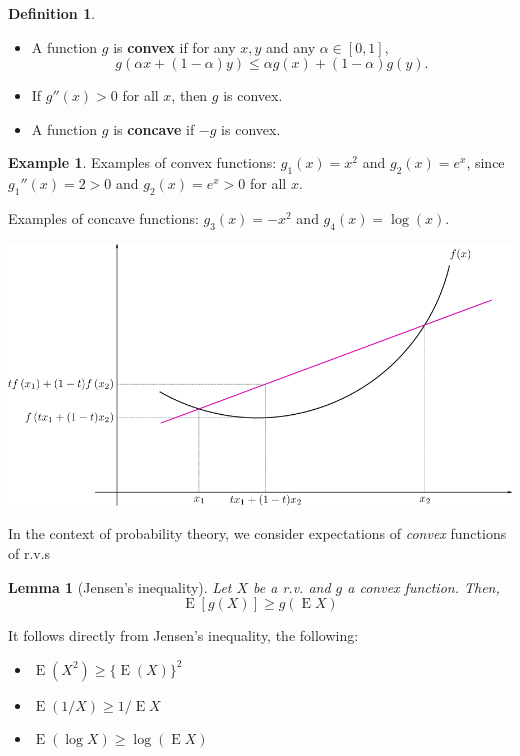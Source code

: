 \documentclass[
]{book}
\providecommand{\tightlist}{%
  \setlength{\itemsep}{0pt}\setlength{\parskip}{0pt}}
\DeclareMathOperator{\E}{E}
\newtheorem{lemma}{Lemma}[chapter]
\theoremstyle{definition}
\newtheorem{definition}{Definition}[chapter]
\theoremstyle{definition}
\newtheorem{example}{Example}[chapter]
\theoremstyle{definition}
\theoremstyle{definition}
\theoremstyle{remark}
\begin{document}
\begin{definition}

\begin{itemize}
\item
  A function \(g\) is \textbf{convex} if for any \(x,y\) and any
  \(\alpha \in [0,1]\),
  \[g(\alpha x + (1-\alpha)y) \leq \alpha g(x) + (1-\alpha)g(y).\]
\item
  If \(g''(x)>0\) for all \(x\), then \(g\) is convex.
\item
  A function \(g\) is \textbf{concave} if \(-g\) is convex.
\end{itemize}

\end{definition}

\begin{example}
Examples of convex functions: \(g_1(x) = x^2\) and \(g_2(x) = e^x\), since
\(g_1''(x) = 2>0\) and \(g_2(x)=e^x > 0\) for all \(x\).

Examples of concave functions: \(g_3(x) = -x^2\) and \(g_4(x) = \log(x)\).
\end{example}

\begin{center}\includegraphics[width=0.8\linewidth]{figure/01-jensen} \end{center}

In the context of probability theory, we consider expectations of \emph{convex} functions of r.v.s

\begin{lemma}[Jensen's inequality]
Let \(X\) be a r.v. and \(g\) a convex function. Then, \[\E\left[g(X) \right] \geq g\left(\E X \right)\]
\end{lemma}

It follows directly from Jensen's inequality, the following:

\begin{itemize}
\tightlist
\item
  \(\E(X^2) \geq \{\E(X)\}^2\)
\item
  \(\E(1/X) \geq 1 / \E X\)
\item
  \(\E(\log X) \geq \log (\E X)\)
\end{itemize}
\end{document}
